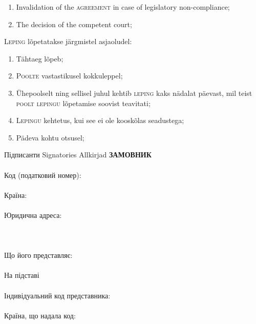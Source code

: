 \begin{Form}
\begin{paracol}{3}
{\begin{enumerate}
          \item Invalidation of the \textsc{agreement} in case of legislatory non-compliance;
          \item The decision of the competent court; 
        \end{enumerate} }
        {L\textsc{eping} lõpetatakse järgmistel asjaoludel:
        \begin{enumerate}
          \item Tähtaeg lõpeb;\\
          \item P\textsc{oolte} vastastikusel kokkuleppel;\\
          \item Ühepoolselt ning sellisel juhul kehtib \textsc{leping} kaks nädalat päevast, mil teist \textsc{poolt lepingu} lõpetamise soovist teavitati;\\
          \item L\textsc{epingu} kehtetus, kui see ei ole kooskõlas seadustega;\\
          \item Pädeva kohtu otsusel;\\
        \end{enumerate}
        }
      \clausenewpage
        {Підписанти}
        {Signatories}
        {Allkirjad}
        {\textbf{ЗАМОВНИК}\\
        \\
        Код (податковий номер):\\
        \\
        Країна:\\
        \\
        Юридична адреса:\\
        \\
        \\
        \\
        Що його представляє:\\
        \\
        На підставі\\
        \\
        Індивідуальний код представника:\\
        \\
        Країна, що надала код:\\
        \\
}
\end{paracol}
\end{Form}
